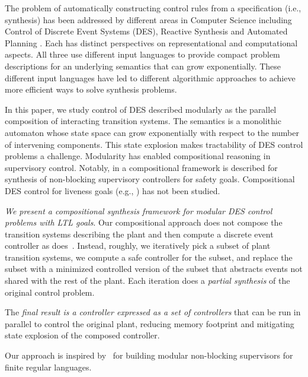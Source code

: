 The problem of automatically constructing control rules from a specification (i.e., synthesis) has been addressed by different areas in Computer Science including  Control of Discrete Event Systems (DES)\cite{ramadge_supervisory_1987}, Reactive Synthesis \cite{pnueli_synthesis} and Automated Planning \cite{nau2004automated}. Each has distinct perspectives on representational and computational aspects. All three use different input languages to provide compact problem descriptions for an underlying semantics that can grow exponentially. These different input languages have led to different algorithmic approaches to achieve more efficient ways to solve synthesis problems.

In this paper, we study control of DES described modularly as the parallel composition of  interacting transition systems. The semantics is a monolithic automaton whose state space can grow exponentially with respect to the number of intervening components. This state explosion makes tractability of DES control problems a  challenge. 
Modularity has enabled compositional reasoning in supervisory control. Notably, in \cite{mohajerani_framework_2014} a compositional framework is described for synthesis of non-blocking supervisory controllers for safety goals. Compositional  DES control for liveness goals (e.g., \cite{Piterman:2006:SRD, DIppolito2008, thistle_control_1995})
has not been studied.

\textit{We present a compositional synthesis framework for modular DES control problems with LTL goals}. 
Our compositional approach does not compose the transition systems describing the plant and then compute a discrete event controller as does~\cite{DIppolito2008}. Instead, roughly, we iteratively pick a subset of plant transition systems, we compute a safe controller for the subset, and replace the subset with a minimized controlled version of the subset that abstracts events not shared with the rest of the plant. Each iteration does a \textit{partial synthesis} of the original control problem.  

The \textit{final result is a controller expressed as a set of controllers} that can be run in parallel to control the original plant, reducing memory footprint and mitigating state explosion of the composed controller.

Our approach is inspired by~\cite{mohajerani_framework_2014} for building modular non-blocking supervisors for finite regular languages.

